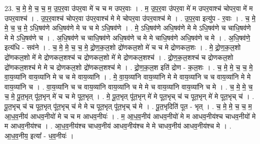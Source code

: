 \documentclass[17pt]{extarticle}
\begin{document}
23. च॒ मे॒ मे॒ च॒ च॒ म॒ उ॒प॒र॒वा उ॑पर॒वा मे॑ च च म उपर॒वाः । . म॒ उ॒प॒र॒वा उ॑पर॒वा मे॑ म उपर॒वाश्च॑ चोपर॒वा मे॑ म उपर॒वाश्च॑ । . उ॒प॒र॒वाश्च॑ चोपर॒वा उ॑पर॒वाश्च॑ मे मे चोपर॒वा उ॑पर॒वाश्च॑ मे । . उ॒प॒र॒वा इत्यु॑प - र॒वाः । . च॒ मे॒ मे॒ च॒ च॒ मे॒ ऽधि॒षव॑णे अधि॒षव॑णे मे च च मे ऽधि॒षव॑णे । . मे॒ ऽधि॒षव॑णे अधि॒षव॑णे मे मे ऽधि॒षव॑णे च चाधि॒षव॑णे मे मे ऽधि॒षव॑णे च । . अ॒धि॒षव॑णे च चाधि॒षव॑णे अधि॒षव॑णे च मे मे चाधि॒षव॑णे अधि॒षव॑णे च मे । . अ॒धि॒षव॑णे॒ इत्य॑धि - सव॑ने । . च॒ मे॒ मे॒ च॒ च॒ मे॒ द्रो॒ण॒क॒ल॒शो द्रो॑णकल॒शो मे॑ च च मे द्रोणकल॒शः । . मे॒ द्रो॒ण॒क॒ल॒शो द्रो॑णकल॒शो मे॑ मे द्रोणकल॒शश्च॑ च द्रोणकल॒शो मे॑ मे द्रोणकल॒शश्च॑ । . द्रो॒ण॒क॒ल॒शश्च॑ च द्रोणकल॒शो द्रो॑णकल॒शश्च॑ मे मे च द्रोणकल॒शो द्रो॑णकल॒शश्च॑ मे । . द्रो॒ण॒क॒ल॒श इति॑ द्रोण - क॒ल॒शः । . च॒ मे॒ मे॒ च॒ च॒ मे॒ वा॒य॒व्या॑नि वाय॒व्या॑नि मे च च मे वाय॒व्या॑नि । . मे॒ वा॒य॒व्या॑नि वाय॒व्या॑नि मे मे वाय॒व्या॑नि च च वाय॒व्या॑नि मे मे वाय॒व्या॑नि च । . वा॒य॒व्या॑नि च च वाय॒व्या॑नि वाय॒व्या॑नि च मे मे च वाय॒व्या॑नि वाय॒व्या॑नि च मे । . च॒ मे॒ मे॒ च॒ च॒ मे॒ पू॒त॒भृत् पू॑त॒भृन् मे॑ च च मे पूत॒भृत् । . मे॒ पू॒त॒भृत् पू॑त॒भृन् मे॑ मे पूत॒भृच् च॑ च पूत॒भृन् मे॑ मे पूत॒भृच् च॑ । . पू॒त॒भृच् च॑ च पूत॒भृत् पू॑त॒भृच् च॑ मे मे च पूत॒भृत् पू॑त॒भृच् च॑ मे । . पू॒त॒भृदिति॑ पूत - भृत् । . च॒ मे॒ मे॒ च॒ च॒ म॒ आ॒ध॒व॒नीय॑ आधव॒नीयो॑ मे च च म आधव॒नीयः॑ । . म॒ आ॒ध॒व॒नीय॑ आधव॒नीयो॑ मे म आधव॒नीय॑श्च चाधव॒नीयो॑ मे म आधव॒नीय॑श्च । . आ॒ध॒व॒नीय॑श्च चाधव॒नीय॑ आधव॒नीय॑श्च मे मे चाधव॒नीय॑ आधव॒नीय॑श्च मे । . आ॒ध॒व॒नीय॒ इत्या᳚ - ध॒व॒नीयः॑ । \newline
\end{document}

